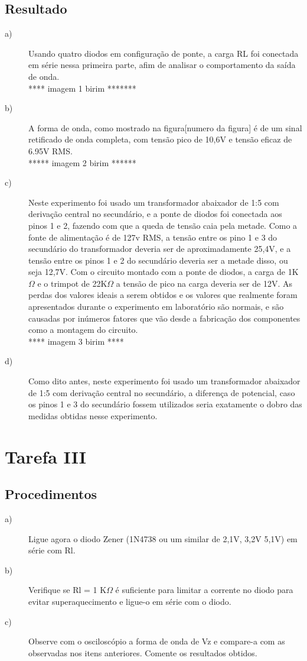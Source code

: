 \subsection{Resultado}
\begin{description}
	\item[a)]Usando quatro diodos em configuração de ponte, a carga RL foi conectada em série nessa primeira parte, afim de analisar o comportamento da saída de onda.\\
	**** imagem 1 birim *******\\
	\item[b)] A forma de onda, como mostrado na figura[numero da figura] é de um sinal retificado de onda completa, com tensão pico de 10,6V e tensão eficaz de 6.95V RMS.\\
	***** imagem 2 birim ******\\
	\item[c)] Neste experimento foi usado um transformador abaixador de 1:5 com derivação central no secundário, e a ponte de diodos foi conectada aos pinos 1 e 2, fazendo com que a queda de tensão caia pela metade. Como a fonte de alimentação é de 127v RMS, a tensão entre os pino 1 e 3 do secundário do transformador deveria ser de aproximadamente 25,4V, e a tensão entre os pinos 1 e 2 do secundário deveria ser a metade disso, ou seja 12,7V.
	Com o circuito montado com a ponte de diodos, a carga de 1K$\Omega$  e o trimpot de 22K$\Omega$ a tensão de pico na carga deveria ser de 12V.
	As perdas dos valores ideais a serem obtidos e os valores que realmente foram apresentados durante o experimento em laboratório são normais, e são causadas por inúmeros fatores que vão desde a fabricação dos componentes como a montagem do circuito.\\
	**** imagem 3 birim **** \\
	\item[d)]Como dito antes, neste experimento foi usado um transformador abaixador de 1:5 com derivação central no secundário, a diferença de potencial, caso os pinos 1 e 3 do secundário fossem utilizados seria exatamente o dobro das medidas obtidas nesse experimento.
\end{description}

\section{Tarefa III}
\subsection{Procedimentos}
\begin{description}
	\item[a)] Ligue agora o diodo Zener (1N4738 ou um similar de 2,1V, 3,2V 5,1V) em série com Rl. \\
	\item[b)] Verifique se Rl = 1 K$\Omega$ é suficiente para limitar a corrente no diodo para evitar superaquecimento e ligue-o em série com o diodo.
	\item[c)] Observe com o osciloscópio a forma de onda de Vz e compare-a com as observadas nos itens anteriores. Comente os resultados obtidos.
\end{description}

